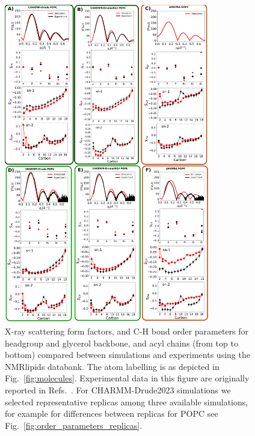 \documentclass[journal=jacsat,manuscript=article,layout=singlecolumn]{achemso}
\begin{document}
\begin{figure}[!p]
    \centering
    \includegraphics[width=0.8\textwidth]{Figures/quality.pdf}
    \caption{X-ray scattering form factors, and C-H bond order parameters for headgroup and glycerol backbone, and acyl chains (from top to bottom) compared between simulations and experiments using the NMRlipids databank. The atom labelling is as depicted in Fig.~\ref{fig:molecules}. Experimental data in this figure are originally reported in Refs.~. For CHARMM-Drude2023 simulations we selected representative replicas among three available simulations, for example for differences between replicas for POPC see Fig.~\ref{fig:order_parameters_replicas}.}
    \label{fig:order_parameters}

\end{figure}
\end{document}
